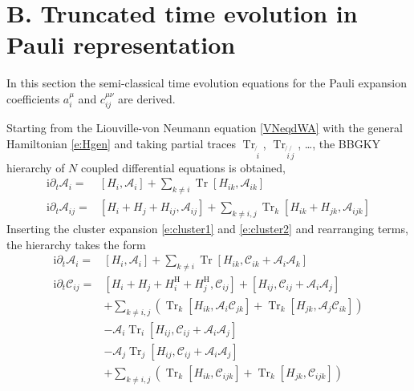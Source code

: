 \documentclass[aps,prl,showpacs,amsmath,amssymb,superscriptaddress,reprint,10pt]{revtex4-1}
\newcommand\ii{{\mathrm{i}}}
\newcommand{\Com}[2]{\left[{#1},{#2}\right]}
\DeclareMathOperator{\Tr}{{Tr}}
\begin{document}
\section{B. Truncated time evolution in Pauli representation}
\setcounter{section}{2}
\setcounter{equation}{0}
\setcounter{figure}{0}

In this section the semi-classical time evolution equations for the Pauli expansion coefficients $a_i^\mu$ and $c_{ij}^{\mu\nu}$ are derived.

Starting from the Liouville-von Neumann equation \eqref{VNeqdWA} with the general Hamiltonian \eqref{e:Hgen} and taking partial traces $\Tr_{\not{\,i}}$, $\Tr_{\not{\,i}\not{\,j}}$, \dots, the BBGKY hierarchy of $N$ coupled differential equations is obtained,
\begin{subequations}
\begin{align}
\ii\partial_t \mathscr{A}_i=&\Com{H_i}{\mathscr{A}_i}+\sum_{k\neq i}\Tr\Com{H_{ik}}{\mathscr{A}_{ik}}\label{e:1st_order_app1}\\
\ii\partial_t \mathscr{A}_{ij}=&\Com{H_i+H_j+H_{ij}}{\mathscr{A}_{ij}}+\sum_{k\neq i,j}\Tr_k\Com{H_{ik}+H_{jk}}{\mathscr{A}_{ijk}}
\label{e:2nd_order_app1}
\end{align}
\end{subequations}
Inserting the cluster expansion \eqref{e:cluster1} and \eqref{e:cluster2} and rearranging terms, the hierarchy takes the form 
\begin{subequations}
\begin{align}
\ii\partial_t \mathscr{A}_i=&\Com{H_i}{\mathscr{A}_i}+\sum_{k\neq i}\Tr\Com{H_{ik}}{\mathscr{C}_{ik}+\mathscr{A}_i \mathscr{A}_k}\label{e:1st_order_app2}\\
\ii\partial_t \mathscr{C}_{ij}=&\Com{H_i+H_j+H_i^\text{H}+H_j^\text{H}}{\mathscr{C}_{ij}}+\Com{H_{ij}}{\mathscr{C}_{ij}+\mathscr{A}_i \mathscr{A}_j}\nonumber\\
&+\sum_{k\neq i,j}\left(\Tr_k\Com{H_{ik}}{\mathscr{A}_i \mathscr{C}_{jk}}+\Tr_k\Com{H_{jk}}{\mathscr{A}_j \mathscr{C}_{ik}}\right)\nonumber\\
&-\mathscr{A}_i\Tr_i\Com{H_{ij}}{\mathscr{C}_{ij}+\mathscr{A}_i \mathscr{A}_j}\nonumber\\
&-\mathscr{A}_j\Tr_j\Com{H_{ij}}{\mathscr{C}_{ij}+\mathscr{A}_i \mathscr{A}_j}\nonumber\\
&+\sum_{k\neq i,j}\left(\Tr_k\Com{H_{ik}}{\mathscr{C}_{ijk}}+\Tr_k\Com{H_{jk}}{\mathscr{C}_{ijk}}\right)
\label{e:2nd_order_app2}
\end{align}
\end{subequations}
\end{document}
